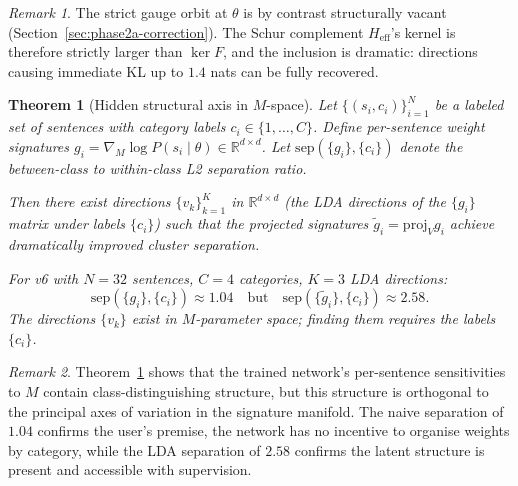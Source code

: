 \documentclass[11pt, a4paper]{article}
\theoremstyle{plain}
\newtheorem{theorem}{Theorem}
\theoremstyle{definition}
\theoremstyle{remark}
\newtheorem{remark}{Remark}
\begin{document}
\begin{remark}
The strict gauge orbit at $\theta$ is by contrast structurally vacant (Section~\ref{sec:phase2a-correction}).
The Schur complement $H_{\text{eff}}$'s kernel is therefore strictly larger than $\ker F$, and the inclusion is dramatic: directions causing immediate KL up to $1.4$ nats can be fully recovered.
\end{remark}

\begin{theorem}[Hidden structural axis in $M$-space]
\label{thm:hidden-axis}
Let $\{(s_i, c_i)\}_{i=1}^{N}$ be a labeled set of sentences with category labels $c_i \in \{1, \ldots, C\}$.
Define per-sentence weight signatures $g_i = \nabla_M \log P(s_i \mid \theta) \in \mathbb{R}^{d \times d}$.
Let $\mathrm{sep}(\{g_i\}, \{c_i\})$ denote the between-class to within-class L2 separation ratio.

Then there exist directions $\{v_k\}_{k=1}^{K}$ in $\mathbb{R}^{d \times d}$ (the LDA directions of the $\{g_i\}$ matrix under labels $\{c_i\}$) such that the projected signatures $\tilde g_i = \mathrm{proj}_V g_i$ achieve dramatically improved cluster separation.

For v6 with $N = 32$ sentences, $C = 4$ categories, $K = 3$ LDA directions:
\begin{equation}
\mathrm{sep}(\{g_i\},\{c_i\}) \approx 1.04 \quad\text{but}\quad \mathrm{sep}(\{\tilde g_i\},\{c_i\}) \approx 2.58.
\end{equation}
The directions $\{v_k\}$ exist in $M$-parameter space; finding them requires the labels $\{c_i\}$.
\end{theorem}

\begin{remark}
Theorem~\ref{thm:hidden-axis} shows that the trained network's per-sentence sensitivities to $M$ contain class-distinguishing structure, but this structure is orthogonal to the principal axes of variation in the signature manifold.
The naive separation of $1.04$ confirms the user's premise, the network has no incentive to organise weights by category, while the LDA separation of $2.58$ confirms the latent structure is present and accessible with supervision.
\end{remark}
\end{document}
